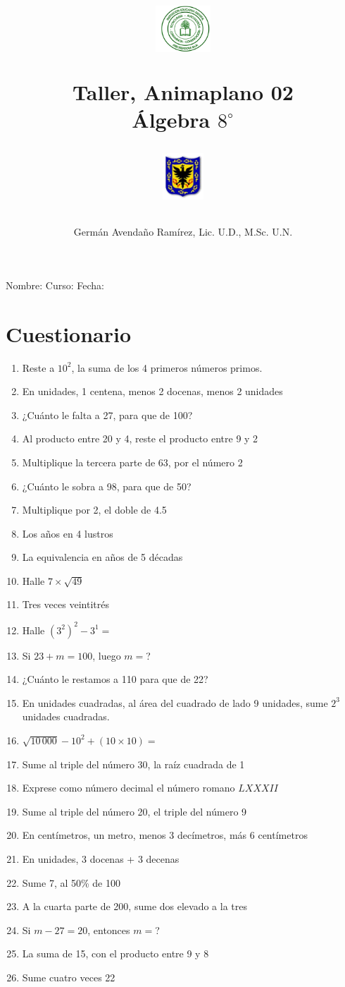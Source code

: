 \documentclass[10pt,twoside]{article}
\author{Germ\'an Avenda\~no Ram\'irez, Lic. U.D., M.Sc. U.N.}
\title{\begin{minipage}{.2\textwidth}
\includegraphics[height=1.75cm]{Images/logo-colegio.png}\end{minipage}
\begin{minipage}{.55\textwidth}
\begin{center}
Taller, Animaplano 02 \\
Álgebra $8^{\circ}$
\end{center}
\end{minipage}\hfill
\begin{minipage}{.2\textwidth}
\includegraphics[height=1.75cm]{Images/logo-sed.png} 
\end{minipage}}
\date{}
\begin{document}
\maketitle
Nombre: \hrulefill Curso: \underline{\hspace*{44pt}} Fecha: \underline{\hspace*{2.5cm}}
\section*{Cuestionario}
\begin{enumerate}
 \item Reste a $10^{2}$, la suma de los 4 primeros números primos.
 \item En unidades, 1 centena, menos 2 docenas, menos 2 unidades
 \item ¿Cuánto le falta a 27, para que de 100?
 \item Al producto entre 20 y 4, reste el producto entre 9 y 2
 \item Multiplique la tercera parte de 63, por el número 2
 \item ¿Cuánto le sobra a 98, para que de 50?
 \item Multiplique por 2, el doble de 4.5
 \item Los años en 4 lustros
 \item La equivalencia en años de 5 décadas
 \item Halle $7\times \sqrt{49}$
 \item Tres veces veintitrés
 \item Halle $(3^{2})^{2}-3^{1}=$
 \item Si $23+m=100$, luego $m=$?
 \item ¿Cuánto le restamos a 110 para que de 22?
 \item En unidades cuadradas, al área del cuadrado de lado 9 unidades, sume $2^{3}$ unidades cuadradas.
 \item $\sqrt{10\,000}-10^{2}+(10\times10)=$
 \item Sume al triple del n\'umero 30, la ra\'iz cuadrada de 1
 \item Exprese como n\'umero decimal el n\'umero romano $LXXXII$
 \item Sume al triple del n\'umero 20, el triple del n\'umero 9
 \item En cent\'imetros, un metro, menos 3 dec\'imetros, m\'as 6 cent\'imetros
 \item En unidades, 3 docenas + 3 decenas
 \item Sume 7, al 50\% de 100
 \item A la cuarta parte de 200, sume dos elevado a la tres
 \item Si $m-27=20$, entonces $m=$?
 \item La suma de 15, con el producto entre 9 y 8
 \item Sume cuatro veces 22
\end{enumerate}
\end{document}
